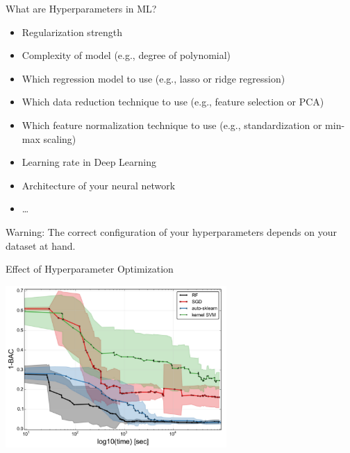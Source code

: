 \documentclass[aspectratio=169]{../latex_main/tntbeamer}  %
\begin{document}
\begin{frame}[c]{What are Hyperparameters in ML?}
	
	\begin{itemize}
	    \item Regularization strength
	    \item Complexity of model (e.g., degree of polynomial)
	    \smallskip
	    \item Which regression model to use (e.g., lasso or ridge regression)
	    \item Which data reduction technique to use (e.g., feature selection or PCA)
	    \item Which feature normalization technique to use (e.g., standardization or min-max scaling)
	    \smallskip
	    \item Learning rate in Deep Learning
	    \item Architecture of your neural network
	    \item \ldots
	\end{itemize}
	
	\bigskip
	\alert{Warning:} The correct configuration of your hyperparameters depends on your dataset at hand.
	
\end{frame}
\begin{frame}[c]{Effect of Hyperparameter Optimization}
	
	\centering
\includegraphics[width=0.63\textwidth]{image12.png}
	
\end{frame}
\end{document}
